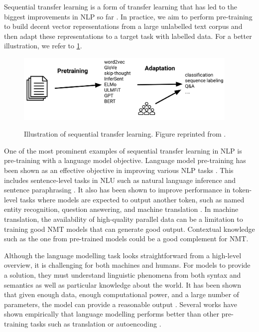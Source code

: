 Sequential transfer learning is a form of transfer learning that has led to the biggest improvements in NLP so far . In practice, we aim to perform pre-training to build decent vector representations from a large unlabelled text corpus and then adapt these representations to a target task with labelled data. For a better illustration, we refer to \cref{img:seq_tl}.

\begin{figure}[h]
    {\includegraphics[width=0.95\textwidth]{img/sequential_tl.png}}
    \centering
    \caption{Illustration of sequential transfer learning. Figure reprinted from .}
    \label{img:seq_tl}
\end{figure}

One of the most prominent examples of sequential transfer learning in NLP is pre-training with a language model objective. Language model pre-training has been shown as an effective objective in improving various NLP tasks . This includes sentence-level tasks in NLU such as natural language inference  and sentence paraphrasing . It also has been shown to improve performance in token-level tasks where models are expected to output another token, such as named entity recognition, question answering, and machine translation . In machine translation, the availability of high-quality parallel data can be a limitation to training good NMT models that can generate good output. Contextual knowledge such as the one from pre-trained models could be a good complement for NMT.

Although the language modelling task looks straightforward from a high-level overview, it is challenging for both machines and humans. For models to provide a solution, they must understand linguistic phenomena from both syntax and semantics as well as particular knowledge about the world. It has been shown that given enough data, enough computational power, and a large number of parameters, the model can provide a reasonable output . Several works have shown empirically that language modelling performs better than other pre-training tasks such as translation or autoencoding .

